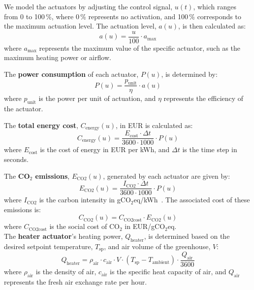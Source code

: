 \documentclass[conference]{IEEEtran}
\begin{document}
We model the actuators by adjusting the control signal, \( u(t) \), which ranges from 0 to 100\,\%, where 0\,\% represents no activation, and 100\,\% corresponds to the maximum actuation level. The actuation level, \( a(u) \), is then calculated as:
\begin{equation}
    a(u) = \frac{u}{100} \cdot a_{\text{max}}
\end{equation}
where \( a_{\text{max}} \) represents the maximum value of the specific actuator, such as the maximum heating power or airflow.

The \textbf{power consumption} of each actuator, \( P(u) \), is determined by:
\begin{equation}
    P(u) = \frac{p_{\text{unit}}}{\eta} \cdot a(u)
\end{equation}
where \( p_{\text{unit}} \) is the power per unit of actuation, and \( \eta \) represents the efficiency of the actuator.

The \textbf{total energy cost}, \( C_{\text{energy}}(u) \), in EUR is calculated as:
\begin{equation}
    C_{\text{energy}}(u) = \frac{E_{\text{cost}} \cdot \Delta t}{3600 \cdot 1000} \cdot P(u) 
\end{equation}
where \( E_{\text{cost}} \) is the cost of energy in EUR per kWh, and \( \Delta t \) is the time step in seconds.

The \textbf{CO$_2$ emissions}, \( E_{\text{CO2}}(u) \), generated by each actuator are given by:
\begin{equation}
    E_{\text{CO2}}(u) = \frac{I_{\text{CO2}} \cdot \Delta t}{3600 \cdot 1000} \cdot P(u)
\end{equation}
where \( I_{\text{CO2}} \) is the carbon intensity in gCO$_2$eq/kWh~\cite{ElectricityMaps2022}. The associated cost of these emissions is:
\begin{equation}
    C_{\text{CO2}}(u) = C_{\text{CO2cost}} \cdot E_{\text{CO2}}(u)
\end{equation}
where \( C_{\text{CO2cost}} \) is the social cost of CO$_2$ in EUR/gCO$_2$eq.\\

The \textbf{heater actuator}'s heating power, \( Q_{\text{heater}} \), is determined based on the desired setpoint temperature, \( T_{\text{sp}} \), and air volume of the greenhouse, \( V \):
\begin{equation}
    Q_{\text{heater}} = \rho_{\text{air}} \cdot c_{\text{air}} \cdot V \cdot (T_{\text{sp}} - T_{\text{ambient}}) \cdot \frac{Q_{\text{air}}}{3600}
\end{equation}
where \( \rho_{\text{air}} \) is the density of air, \( c_{\text{air}} \) is the specific heat capacity of air, and \( Q_{\text{air}} \) represents the fresh air exchange rate per hour.
\end{document}
